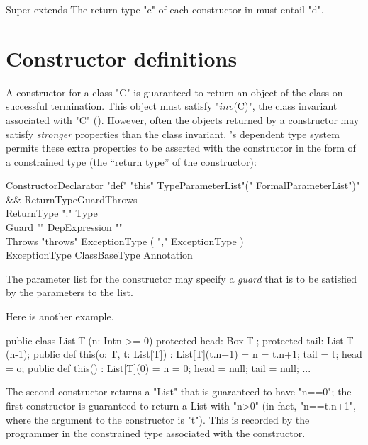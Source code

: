 \begin{staticrule}{Super-extends}
The return type \xcd"c" of each constructor in 
must entail \xcd"d".
\end{staticrule}

\section{Constructor definitions}

A constructor for a class \xcd"C" is guaranteed to return an object of the
class on successful termination. This object must satisfy  \xcdmath"$\mathit{inv}$(C)", the
class invariant associated with \xcd"C" ().
However,
often the objects returned by a constructor may satisfy {\em stronger}
properties than the class invariant. \Xten{}'s dependent type system
permits these extra properties to be asserted with the constructor in
the form of a constrained type (the ``return type'' of the constructor):

\begin{grammar}
ConstructorDeclarator \:
  \xcd"def" \xcd"this" TypeParameterList\opt \xcd"(" FormalParameterList\opt \xcd")" \\
  && ReturnType\opt Guard\opt Throws\opt \\
ReturnType    \: \xcd":" Type \\
Guard   \: "{" DepExpression "}" \\
Throws    \: \xcd"throws" ExceptionType  ( \xcd"," ExceptionType )\star \\
ExceptionType \: ClassBaseType Annotation\star \\
\end{grammar}

\label{ConstructorGuard}

The parameter list for the constructor
may specify a \emph{guard} that is to be satisfied by the parameters
to the list.

\begin{example}
Here is another example.
\begin{xten}
public class List[T](n: Int{n >= 0}) {
    protected head: Box[T];
    protected tail: List[T](n-1);
    public def this(o: T, t: List[T]) : List[T](t.n+1) = {
        n = t.n+1;
        tail = t;
        head = o;
    }
    public def this() : List[T](0) = {
        n = 0;
        head = null;
        tail = null;
    }
    ...
}
\end{xten}
The second constructor returns a \xcd"List" that is guaranteed to have
\xcd"n==0";
the first constructor is guaranteed to return a List with \xcd"n>0"
(in fact, \xcd"n==t.n+1", where the argument to the constructor is \xcd"t"). 
This is recorded by the programmer in the constrained type associated with the
constructor.
\end{example}

